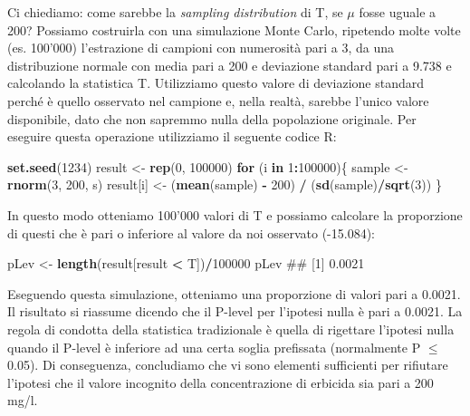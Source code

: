 \documentclass[a4paper,12pt,oneside]{book}
\newenvironment{Shaded}{\begin{snugshade}}{\end{snugshade}}
\newcommand{\KeywordTok}[1]{\textcolor[rgb]{0.13,0.29,0.53}{\textbf{#1}}}
\newcommand{\DecValTok}[1]{\textcolor[rgb]{0.00,0.00,0.81}{#1}}
\newcommand{\StringTok}[1]{\textcolor[rgb]{0.31,0.60,0.02}{#1}}
\newcommand{\ControlFlowTok}[1]{\textcolor[rgb]{0.13,0.29,0.53}{\textbf{#1}}}
\newcommand{\OperatorTok}[1]{\textcolor[rgb]{0.81,0.36,0.00}{\textbf{#1}}}
\newcommand{\NormalTok}[1]{#1}
\theoremstyle{definition}
\theoremstyle{definition}
\theoremstyle{definition}
\theoremstyle{remark}
\begin{document}
Ci chiediamo: come sarebbe la \emph{sampling distribution} di T, se
\(\mu\) fosse uguale a 200? Possiamo costruirla con una simulazione
Monte Carlo, ripetendo molte volte (es. 100'000) l'estrazione di
campioni con numerosità pari a 3, da una distribuzione normale con media
pari a 200 e deviazione standard pari a 9.738 e calcolando la statistica
T. Utilizziamo questo valore di deviazione standard perché è quello
osservato nel campione e, nella realtà, sarebbe l'unico valore
disponibile, dato che non sapremmo nulla della popolazione originale.
Per eseguire questa operazione utilizziamo il seguente codice R:

\begin{Shaded}
\begin{Highlighting}[]
\KeywordTok{set.seed}\NormalTok{(}\DecValTok{1234}\NormalTok{)}
\NormalTok{result <-}\StringTok{ }\KeywordTok{rep}\NormalTok{(}\DecValTok{0}\NormalTok{, }\DecValTok{100000}\NormalTok{)}
\ControlFlowTok{for}\NormalTok{ (i }\ControlFlowTok{in} \DecValTok{1}\OperatorTok{:}\DecValTok{100000}\NormalTok{)\{}
\NormalTok{  sample <-}\StringTok{ }\KeywordTok{rnorm}\NormalTok{(}\DecValTok{3}\NormalTok{, }\DecValTok{200}\NormalTok{, s)}
\NormalTok{  result[i] <-}\StringTok{ }\NormalTok{(}\KeywordTok{mean}\NormalTok{(sample) }\OperatorTok{-}\StringTok{ }\DecValTok{200}\NormalTok{) }\OperatorTok{/}\StringTok{ }\NormalTok{(}\KeywordTok{sd}\NormalTok{(sample)}\OperatorTok{/}\KeywordTok{sqrt}\NormalTok{(}\DecValTok{3}\NormalTok{))}
\NormalTok{\}}
\end{Highlighting}
\end{Shaded}

In questo modo otteniamo 100'000 valori di T e possiamo calcolare la
proporzione di questi che è pari o inferiore al valore da noi osservato
(-15.084):

\begin{Shaded}
\begin{Highlighting}[]
\NormalTok{pLev <-}\StringTok{ }\KeywordTok{length}\NormalTok{(result[result }\OperatorTok{<}\StringTok{ }\NormalTok{T])}\OperatorTok{/}\DecValTok{100000}
\NormalTok{pLev}
\NormalTok{## [1] 0.0021}
\end{Highlighting}
\end{Shaded}

Eseguendo questa simulazione, otteniamo una proporzione di valori pari a
0.0021. Il risultato si riassume dicendo che il P-level per l'ipotesi
nulla è pari a 0.0021. La regola di condotta della statistica
tradizionale è quella di rigettare l'ipotesi nulla quando il P-level è
inferiore ad una certa soglia prefissata (normalmente P \(\leq\) 0.05).
Di conseguenza, concludiamo che vi sono elementi sufficienti per
rifiutare l'ipotesi che il valore incognito della concentrazione di
erbicida sia pari a 200 mg/l.
\end{document}
